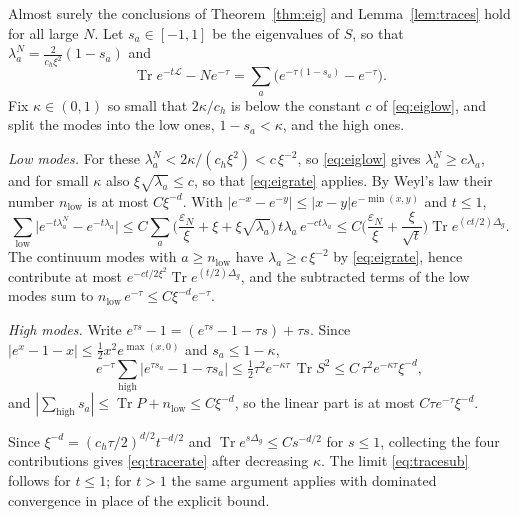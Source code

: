 \documentclass[11pt,a4paper]{article}
\makeatletter
\theoremstyle{stmt}
\theoremstyle{defn}
\theoremstyle{rmk}
\renewenvironment{proof}[1][\proofname]{\par\pushQED{\qed}\normalfont\topsep6\p@\@plus6\p@\relax
  \trivlist\item[\hskip\labelsep{\sffamily\itshape\small #1.}]\ignorespaces}{\popQED\endtrivlist\@endpefalse}
\numberwithin{equation}{section}
\DeclareMathOperator{\Tr}{Tr}
\newcommand{\Lc}{\mathcal{L}}
\makeatother
\begin{document}
\begin{proof}
Almost surely the conclusions of Theorem~\ref{thm:eig} and Lemma~\ref{lem:traces} hold for all large $N$. Let $s_a\in[-1,1]$ be the eigenvalues of $S$, so that $\lambda_a^N=\tfrac{2}{c_h\xi^2}(1-s_a)$ and
\[
\Tr e^{-t\Lc}-Ne^{-\tau}=\sum_a\big(e^{-\tau(1-s_a)}-e^{-\tau}\big).
\]
Fix $\kappa\in(0,1)$ so small that $2\kappa/c_h$ is below the constant $c$ of \eqref{eq:eiglow}, and split the modes into the low ones, $1-s_a<\kappa$, and the high ones.

\emph{Low modes.} For these $\lambda_a^N<2\kappa/(c_h\xi^2)<c\,\xi^{-2}$, so \eqref{eq:eiglow} gives $\lambda_a^N\ge c\lambda_a$, and for small $\kappa$ also $\xi\sqrt{\lambda_a}\le c$, so that \eqref{eq:eigrate} applies. By Weyl's law their number $n_{\mathrm{low}}$ is at most $C\xi^{-d}$. With $|e^{-x}-e^{-y}|\le|x-y|e^{-\min(x,y)}$ and $t\le1$,
\[
\sum_{\mathrm{low}}\big|e^{-t\lambda_a^N}-e^{-t\lambda_a}\big|\le C\sum_a\Big(\frac{\varepsilon_N}{\xi}+\xi+\xi\sqrt{\lambda_a}\Big)\,t\lambda_a\,e^{-ct\lambda_a}\le C\Big(\frac{\varepsilon_N}{\xi}+\frac{\xi}{\sqrt t}\Big)\Tr e^{(ct/2)\Delta_g}.
\]
The continuum modes with $a\ge n_{\mathrm{low}}$ have $\lambda_a\ge c\,\xi^{-2}$ by \eqref{eq:eigrate}, hence contribute at most $e^{-ct/2\xi^2}\Tr e^{(t/2)\Delta_g}$, and the subtracted terms of the low modes sum to $n_{\mathrm{low}}\,e^{-\tau}\le C\xi^{-d}e^{-\tau}$.

\emph{High modes.} Write $e^{\tau s}-1=(e^{\tau s}-1-\tau s)+\tau s$. Since $|e^x-1-x|\le\tfrac12x^2e^{\max(x,0)}$ and $s_a\le1-\kappa$,
\[
e^{-\tau}\sum_{\mathrm{high}}\big|e^{\tau s_a}-1-\tau s_a\big|\le\tfrac12\tau^2e^{-\kappa\tau}\,\Tr S^2\le C\,\tau^2e^{-\kappa\tau}\xi^{-d},
\]
and $|\sum_{\mathrm{high}}s_a|\le\Tr P+n_{\mathrm{low}}\le C\xi^{-d}$, so the linear part is at most $C\tau e^{-\tau}\xi^{-d}$.

Since $\xi^{-d}=(c_h\tau/2)^{d/2}t^{-d/2}$ and $\Tr e^{s\Delta_g}\le Cs^{-d/2}$ for $s\le1$, collecting the four contributions gives \eqref{eq:tracerate} after decreasing $\kappa$. The limit \eqref{eq:tracesub} follows for $t\le1$; for $t>1$ the same argument applies with dominated convergence in place of the explicit bound.
\end{proof}
\end{document}
